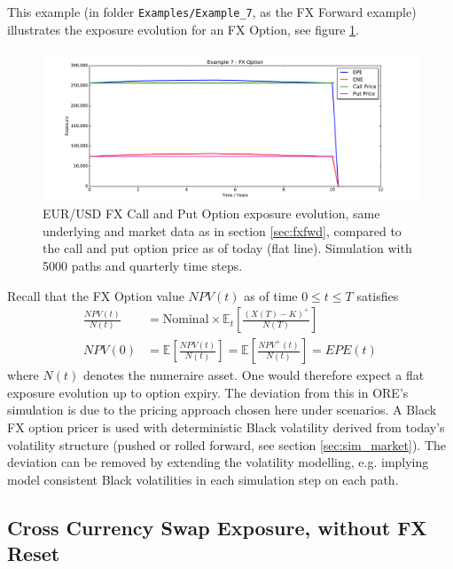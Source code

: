 \documentclass[12pt, a4paper]{article}
\newcommand\E{\ensuremath{\mathbb{E}}}
\newcommand{\EPE}{\mathit{EPE}}
\begin{document}
{This example (in folder {\tt Examples/Example\_7}, as the FX Forward example) illustrates the exposure evolution for an
FX Option, see figure \ref{fig_7}.
\begin{figure}[h!]
\begin{center}
\includegraphics[scale=0.45]{mpl_fxoption.pdf}
\end{center}
\caption{EUR/USD FX Call and Put Option exposure evolution, same underlying and market data as in section
  \ref{sec:fxfwd}, compared to the call and put option price as of today (flat line). Simulation with 5000 paths and
  quarterly time steps.}
\label{fig_7}
\end{figure}
Recall that the FX Option value $NPV(t)$ as of time $0 \leq t \leq T$ satisfies
\begin{align*}
\frac{NPV(t)}{N(t)} &= \mbox{Nominal}\times\E_t\left[\frac{(X(T) - K)^+}{N(T)}\right]\\
NPV(0) &= \E\left[\frac{NPV(t)}{N(t)}\right] = \E\left[\frac{NPV^+(t)}{N(t)} \right]= \EPE(t) 
\end{align*}
where $N(t)$ denotes the numeraire asset.
One would therefore expect a flat exposure evolution up to option expiry. The deviation from this in ORE's simulation is
due to the pricing approach chosen here under scenarios. A Black FX option pricer is used with deterministic Black
volatility derived from today's volatility structure (pushed or rolled forward, see section \ref{sec:sim_market}). The
deviation can be removed by extending the volatility modelling, e.g. implying model consistent Black volatilities in
each simulation step on each path.  

\subsection{Cross Currency Swap Exposure, without FX Reset}

}
\end{document}
